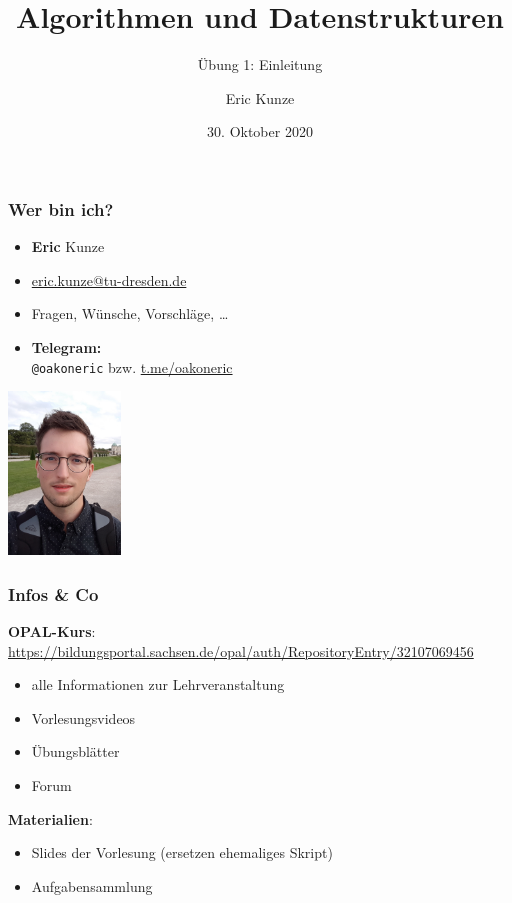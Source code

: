\documentclass{beamer}
\begin{document}
	
	\title{Algorithmen und Datenstrukturen}
	\subtitle{Übung 1: Einleitung}
	\author{Eric Kunze}
	\date{30. Oktober 2020}

	\maketitle
	
	\begin{frame} \frametitle{Wer bin ich?}
		\begin{minipage}{\dimexpr0.75\linewidth-\fboxrule-\fboxsep}
			\flushleft
			\begin{itemize}
				\item \textbf{Eric} \textcolor{cdgray!50}{Kunze}
				\item \url{eric.kunze@tu-dresden.de}
				\item Fragen, Wünsche, Vorschläge, \dots 
				\item \textbf{Telegram:} \\ 
				\texttt{@oakoneric} bzw. \url{t.me/oakoneric}
			\end{itemize}
		\end{minipage}
		\begin{minipage}{\dimexpr0.25\linewidth-\fboxrule-\fboxsep}
			\includegraphics[width=3cm]{./tut01_pic.jpg}
		\end{minipage}		
	\end{frame}

	\begin{frame}\frametitle{Infos \& Co}		
		\textbf{OPAL-Kurs}: \\
		{\small \url{https://bildungsportal.sachsen.de/opal/auth/RepositoryEntry/32107069456}}
		
		\begin{itemize}
			\item alle Informationen zur Lehrveranstaltung
			\item Vorlesungsvideos
			\item Übungsblätter
			\item Forum
		\end{itemize}
		
		\textbf{Materialien}: 
		\begin{itemize}
			\item Slides der Vorlesung (ersetzen ehemaliges Skript)
			\item Aufgabensammlung
		\end{itemize}
	\end{frame}
\end{document}
